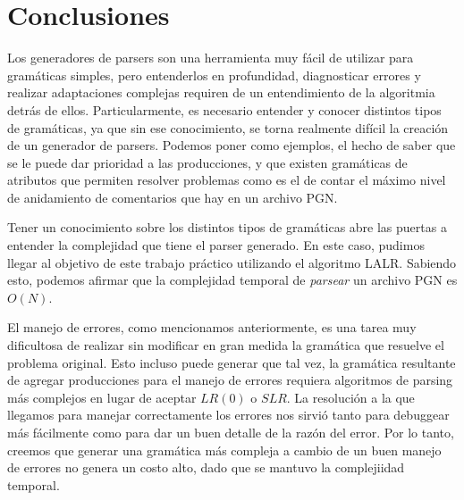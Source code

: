 \section{Conclusiones}
Los generadores de parsers son una herramienta muy fácil de utilizar para
gramáticas simples, pero entenderlos en profundidad, diagnosticar errores y
realizar adaptaciones complejas requiren de un entendimiento de la algoritmia
detrás de ellos.  Particularmente, es necesario entender y conocer distintos
tipos de gramáticas, ya que sin ese conocimiento, se torna realmente difícil la
creación de un generador de parsers. Podemos poner como ejemplos, el hecho de
saber que se le puede dar prioridad a las producciones, y que existen
gramáticas de atributos que permiten resolver problemas como es el de contar el
máximo nivel de anidamiento de comentarios que hay en un archivo PGN.

Tener un conocimiento sobre los distintos tipos de gramáticas abre las puertas
a entender la complejidad que tiene el parser generado. En este caso, pudimos
llegar al objetivo de este trabajo práctico utilizando el algoritmo LALR.
Sabiendo esto, podemos afirmar que la complejidad temporal de \textit{parsear}
un archivo PGN es $O(N)$.

El manejo de errores, como mencionamos anteriormente, es una tarea muy
dificultosa de realizar sin modificar en gran medida la gramática que resuelve
el problema original. Esto incluso puede generar que tal vez, la gramática
resultante de agregar producciones para el manejo de errores requiera
algoritmos de parsing más complejos en lugar de aceptar $LR(0)$ o $SLR$.  La
resolución a la que llegamos para manejar correctamente los errores nos sirvió
tanto para debuggear más fácilmente como para dar un buen detalle de la razón
del error. Por lo tanto, creemos que generar una gramática más compleja a
cambio de un buen manejo de errores no genera un costo alto, dado que se
mantuvo la complejiidad temporal.
